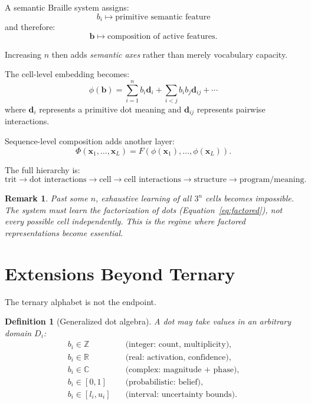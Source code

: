 \documentclass[11pt,a4paper]{article}
\newtheorem{definition}{Definition}
\newtheorem{remark}{Remark}
\newcommand{\R}{\mathbb{R}}
\newcommand{\Z}{\mathbb{Z}}
\newcommand{\bvec}{\bm{b}}
\newcommand{\xvec}{\bm{x}}
\newcommand{\dvec}{\bm{d}}
\begin{document}
A semantic Braille system assigns:
\begin{equation}
  b_i \mapsto \text{primitive semantic feature}
\end{equation}
and therefore:
\begin{equation}
  \bvec \mapsto \text{composition of active features}.
\end{equation}

Increasing $n$ then adds \emph{semantic axes} rather than merely
vocabulary capacity.

The cell-level embedding becomes:
\begin{equation}
  \phi(\bvec) = \sum_{i=1}^{n} b_i \dvec_i
    + \sum_{i < j} b_i b_j \dvec_{ij} + \cdots
  \label{eq:factored}
\end{equation}
where $\dvec_i$ represents a primitive dot meaning and
$\dvec_{ij}$ represents pairwise interactions.

Sequence-level composition adds another layer:
\begin{equation}
  \Phi(\xvec_1, \ldots, \xvec_L) = F(\phi(\xvec_1), \ldots, \phi(\xvec_L)).
\end{equation}

The full hierarchy is:
\begin{equation}
  \text{trit}
  \rightarrow \text{dot interactions}
  \rightarrow \text{cell}
  \rightarrow \text{cell interactions}
  \rightarrow \text{structure}
  \rightarrow \text{program/meaning}.
\end{equation}

\begin{remark}
  Past some $n$, exhaustive learning of all $3^n$ cells becomes
  impossible.
  The system must learn the \emph{factorization of dots}
  (Equation~\ref{eq:factored}), not every possible cell independently.
  This is the regime where factored representations become essential.
\end{remark}

\section{Extensions Beyond Ternary}
\label{sec:extensions}

The ternary alphabet is not the endpoint.

\begin{definition}[Generalized dot algebra]
  A dot may take values in an arbitrary domain $D_i$:
  \begin{align}
    b_i \in \Z       &\quad \text{(integer: count, multiplicity)}, \\
    b_i \in \R       &\quad \text{(real: activation, confidence)}, \\
    b_i \in \mathbb{C} &\quad \text{(complex: magnitude + phase)}, \\
    b_i \in [0,1]    &\quad \text{(probabilistic: belief)}, \\
    b_i \in [l_i, u_i] &\quad \text{(interval: uncertainty bounds)}.
  \end{align}
\end{definition}
\end{document}
